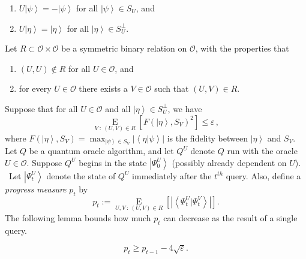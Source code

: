 \begin{enumerate}
\item[(i)] $U\left\vert \psi\right\rangle =-\left\vert \psi\right\rangle
$ for all $\left\vert \psi\right\rangle \in S_{U}$, and

\item[(ii)] $U\left\vert \eta\right\rangle =\left\vert \eta\right\rangle
$ for all $\left\vert \eta\right\rangle \in S_{U}^{\bot}$.
\end{enumerate}

Let $R\subset\mathcal{O}\times\mathcal{O}$ be a symmetric binary relation on
$\mathcal{O}$, with the properties that

\begin{enumerate}
\item[(i)] $\left(  U,U\right)  \notin R$ for all $U\in\mathcal{O}$, and

\item[(ii)] for every $U\in\mathcal{O}$ there exists a $V\in\mathcal{O}%
$ such that $\left(  U,V\right)  \in R$.\
\end{enumerate}

Suppose that for all $U\in\mathcal{O}$ and all $\left\vert \eta\right\rangle
\in S_{U}^{\bot}$, we have%
\[
\operatorname*{E}_{V~:~\left(  U,V\right)  \in R}\left[  F\left(  \left\vert
\eta\right\rangle ,S_{V}\right)  ^{2}\right]  \leq\varepsilon\,,
\]
where $F\left(  \left\vert \eta\right\rangle ,S_{V}\right)  =\max_{\left\vert
\psi\right\rangle \in S_{V}}\left\vert \left\langle \eta|\psi\right\rangle
\right\vert $ is the fidelity between $\left\vert \eta\right\rangle $ and
$S_{V}$. Let $Q$ be a quantum oracle algorithm, and let $Q^{U}$ denote $Q$
run with the oracle $U\in\mathcal{O}$. Suppose $Q^{U}$ begins in the state
$\left\vert \Psi_{0}^{U}\right\rangle $ (possibly already dependent on $U$).
\ Let $\left\vert \Psi_{t}^{U}\right\rangle $ denote the state of $Q^{U}%
$ immediately after the $t^{th}$ query. Also, define a \emph{progress
measure} $p_{t}$ by%
\[
p_{t}:=\operatorname*{E}_{U,V~:~\left(  U,V\right)  \in R}\left[  \left\vert
\left\langle \Psi_{t}^{U}|\Psi_{t}^{V}\right\rangle \right\vert \right]  .
\]
The following lemma bounds how much $p_{t}$ can decrease as the result of a
single query.

\begin{lemma}
\label{innerprod}%
\[
p_{t}\geq p_{t-1}-4\sqrt{\varepsilon}.
\]

\end{lemma}


